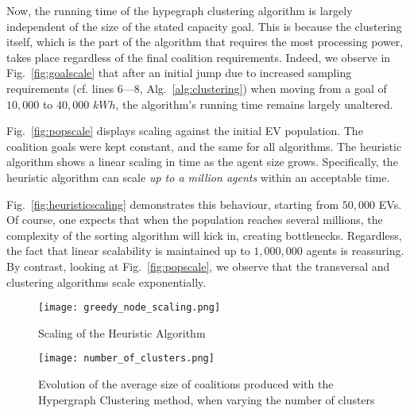 Now, the running time of the hypegraph clustering algorithm is largely independent of the size of the stated capacity goal. 
This is because the clustering itself, which is the part of the algorithm that requires the most processing power, takes place regardless of the final coalition requirements.
Indeed, we observe in Fig.~\ref{fig:goalscale} that after an initial jump due to increased sampling requirements (cf. lines 6---8, Alg.~\ref{alg:clustering}) when moving from a goal of $10,000$ to $40,000$ $kWh$,
the algorithm's running time remains largely unaltered.


Fig.~\ref{fig:popscale} %
displays scaling against the initial EV population. The coalition goals were kept constant, and the same for all algorithms.
The heuristic algorithm shows a linear scaling in time as the agent size grows. Specifically, the heuristic algorithm can scale {\em up to a million agents} within an acceptable time. 


Fig.~\ref{fig:heuristicscaling} demonstrates this behaviour, starting from $50,000$ EVs. Of course, one expects that when the population reaches several millions, the complexity of the sorting algorithm will kick in, creating bottlenecks. Regardless, the fact that linear scalability is maintained up to $1,000,000$ agents is reassuring. By contrast, looking at Fig.~\ref{fig:popscale}, we observe that the transversal and clustering algorithms scale exponentially.

\begin{figure}
	\centering
	\begin{minipage}{.5\textwidth}
		\centering
		\texttt{[image: greedy\_node\_scaling.png]}
		
		\caption{Scaling of the Heuristic Algorithm\label{fig:heuristicscaling}}
		\vspace{20pt}
	\end{minipage}%
	\begin{minipage}{.5\textwidth}
		\texttt{[image: number\_of\_clusters.png]}
		\caption{Evolution of the average size of coalitions produced with the Hypergraph Clustering method, when varying the number of clusters\label{fig:clusterkscale}}
	\end{minipage}
\end{figure}
\vspace{-30pt}

